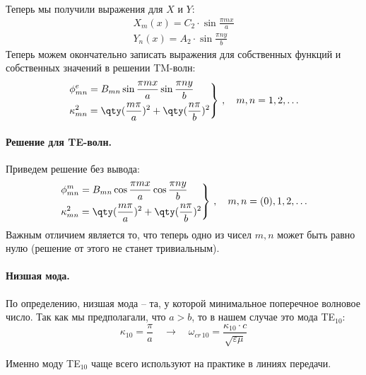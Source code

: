 Теперь мы получили выражения для $X$ и $Y$:
\begin{gather}
	X_m(x)=C_2\cdot\sin\frac{\pi m x}{a}\\
	Y_n(x)=A_2\cdot\sin\frac{\pi n y}{b}
\end{gather}
Теперь можем окончательно записать выражения для собственных функций и собственных значений в решении TM-волн:
\begin{gather}
	\label{phi_tm}
	\left.\begin{aligned}
		&\phi^e_{mn}=B_{mn}\sin\frac{\pi m x}{a}\sin\frac{\pi n y}{b}\\
		&\kappa_{mn}^2=\qty(\frac{m\pi}{a})^2+\qty(\frac{n\pi}{b})^2	
	\end{aligned}\right\}\,, \quad m,n=1,2,\ldots
\end{gather}
\paragraph{Решение для TE-волн.} Приведем решение без вывода:
\begin{gather}
	\label{phi_te}
	\left.\begin{aligned}
		&\phi^m_{mn}=B_{mn}\cos\frac{\pi m x}{a}\cos\frac{\pi n y}{b}\\
		&\kappa_{mn}^2=\qty(\frac{m\pi}{a})^2+\qty(\frac{n\pi}{b})^2	
	\end{aligned}\right\}\,, \quad m,n=(0),1,2,\ldots
\end{gather}
Важным отличием является то, что теперь одно из чисел $m,n$ может быть равно нулю (решение от этого не станет тривиальным).

\paragraph{Низшая мода.} По определению, низшая мода -- та, у которой минимальное поперечное волновое число. Так как мы предполагали, что $a>b$, то в нашем случае это мода TE$_{10}$:
\begin{equation}
	\kappa_{10}=\frac{\pi}{a} \quad \rightarrow \quad \omega_{cr\,10}=\frac{\kappa_{10}\cdot c}{\sqrt{\varepsilon \mu}} 	
\end{equation} 

Именно моду TE$_{10}$ чаще всего используют на практике в линиях передачи. 

